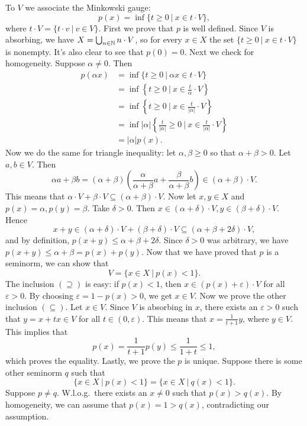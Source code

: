 \begin{myproof}
  To $V$ we associate the Minkowski gauge:
  $$p(x) = \inf \{t \geq 0\ |\ x \in t \cdot V\},$$
  where $t \cdot V = \{t \cdot v\ |\ v \in V\}$.
  First we prove that $p$ is well defined.
  Since $V$ is absorbing, we have $X = \bigcup_{n \in \mathbb {N}} n \cdot V$,
  so for every $x \in X$ the set $\{t \geq 0\ |\ x \in t \cdot V\}$
  is nonempty. It's also clear to see that $p(0) = 0$.
  Next we check for homogeneity. Suppose $\alpha \neq 0$.
  Then 
  \begin{align*}
    p(\alpha x) &= \inf \{t \geq 0\ |\ \alpha x \in t\cdot V\}\\
    &= \inf \left\lbrace t \geq 0\ |\ x \in \frac{t}{\alpha}\cdot V \right\rbrace\\
    &= \inf \left\lbrace t \geq 0\ |\ x \in \frac{t}{|\alpha|}\cdot V \right\rbrace\\
    &= \inf |\alpha| \left\lbrace \frac{t}{|\alpha|} \geq 0\ |\ x \in \frac{t}{|\alpha|}\cdot V \right\rbrace\\
    &= |\alpha| p(x).
  \end{align*}
  Now we do the same for triangle inequality:
  let $\alpha, \beta \geq 0$ so that $\alpha + \beta > 0$.
  Let $a, b \in V$. Then 
  $$\alpha a + \beta b = (\alpha + \beta) \left(\frac{\alpha}{\alpha + \beta} a + \frac{\beta}{\alpha + \beta} b\right) \in (\alpha + \beta) \cdot V.$$
  This means that $\alpha \cdot V + \beta \cdot V \subseteq (\alpha + \beta) \cdot V$.
  Now let $x, y \in X$ and $p(x) = \alpha, p(y) = \beta$.
  Take $\delta > 0$. Then $x \in (\alpha + \delta) \cdot V, y \in (\beta + \delta) \cdot V$.
  Hence $$x + y \in (\alpha + \delta) \cdot V + (\beta + \delta) \cdot V \subseteq (\alpha + \beta + 2 \delta) \cdot V,$$
  and by definition, $p(x + y) \leq \alpha + \beta + 2 \delta$.
  Since $\delta > 0$ was arbitrary, we have $p(x + y) \leq \alpha + \beta = p(x) + p(y)$.
  Now that we have proved that $p$ is a seminorm, we can show that 
  $$V = \{x \in X\ |\ p(x) < 1\}.$$
  The inclusion $(\supseteq)$ is easy: if $p(x) < 1$, then $x \in (p(x) + \varepsilon) \cdot V$
  for all $\varepsilon > 0$. By choosing $\varepsilon = 1 - p(x) > 0$, we get $x \in V$.
  Now we prove the other inclusion $(\subseteq)$. Let $x \in V$.
  Since $V$ is absorbing in $x$, there exists an $\varepsilon > 0$ such that 
  $y = x + tx \in V$ for all $t \in (0, \varepsilon)$. This means that $x = \frac{1}{t + 1} y$, where $y \in V$.
  This implies that 
  $$p(x) = \frac{1}{t + 1} p(y) \leq \frac{1}{1 + t} \leq 1,$$
  which proves the equality. Lastly, we prove the $p$ is unique.
  Suppose there is some other seminorm $q$ such that 
  $$\{x \in X\ |\ p(x) < 1\} = \{x \in X\ |\ q(x) < 1\}.$$
  Suppose $p \neq q$. W.l.o.g.~there exists an $x \neq 0$ such that $p(x) > q(x)$.
  By homogeneity, we can assume that $p(x) = 1 > q(x)$, contradicting our assumption.
\end{myproof}

